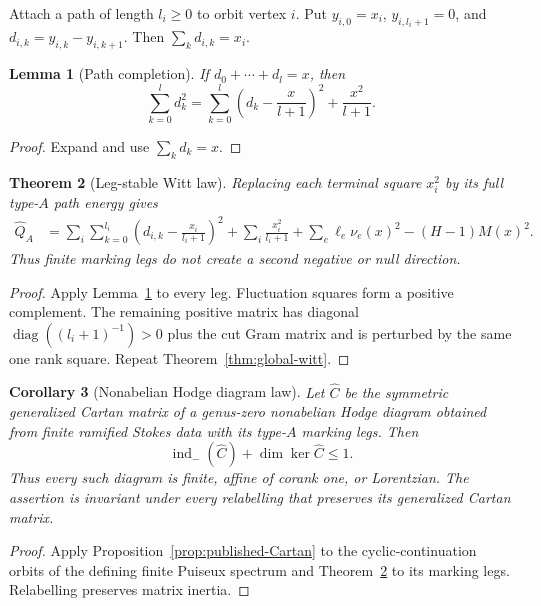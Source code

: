 \documentclass[11pt,a4paper]{amsart}
\theoremstyle{plain}
\newtheorem{theorem}{Theorem}[section]
\newtheorem{lemma}[theorem]{Lemma}
\newtheorem{corollary}[theorem]{Corollary}
\theoremstyle{definition}
\newcommand{\indm}{\operatorname{ind}_{-}}
\begin{document}
Attach a path of length $l_i\geq0$ to orbit vertex $i$.  Put $y_{i,0}=x_i$,
$y_{i,l_i+1}=0$, and $d_{i,k}=y_{i,k}-y_{i,k+1}$.  Then $\sum_kd_{i,k}=x_i$.

\begin{lemma}[Path completion]\label{lem:path}
If $d_0+\cdots+d_l=x$, then
\begin{equation}\label{eq:path}
 \sum_{k=0}^{l}d_k^2=
 \sum_{k=0}^{l}\left(d_k-\frac{x}{l+1}\right)^2+\frac{x^2}{l+1}.
\end{equation}
\end{lemma}

\begin{proof}
Expand and use $\sum_kd_k=x$.
\end{proof}

\begin{theorem}[Leg-stable Witt law]\label{thm:legs}
Replacing each terminal square $x_i^2$ by its full type-$A$ path energy gives
\begin{align}\label{eq:leg-law}
 \widehat Q_A
 &=\sum_i\sum_{k=0}^{l_i}\left(d_{i,k}-\frac{x_i}{l_i+1}\right)^2
   +\sum_i\frac{x_i^2}{l_i+1}
   +\sum_e\ell_e\nu_e(x)^2-(H-1)M(x)^2.
\end{align}
Thus finite marking legs do not create a second negative or null direction.
\end{theorem}

\begin{proof}
Apply Lemma~\ref{lem:path} to every leg.  Fluctuation squares form a positive complement.  The
remaining positive matrix has diagonal $\operatorname{diag}((l_i+1)^{-1})>0$ plus the cut Gram
matrix and is perturbed by the same one rank square.  Repeat Theorem~\ref{thm:global-witt}.
\end{proof}

\begin{corollary}[Nonabelian Hodge diagram law]\label{cor:nah-diagram}
Let $\widehat C$ be the symmetric generalized Cartan matrix of a genus-zero nonabelian Hodge
diagram obtained from finite ramified Stokes data with its type-$A$ marking legs.  Then
\begin{equation}\label{eq:nah-diagram-law}
                  \indm(\widehat C)+\dim\ker\widehat C\leq1.
\end{equation}
Thus every such diagram is finite, affine of corank one, or Lorentzian.  The assertion is invariant
under every relabelling that preserves its generalized Cartan matrix.
\end{corollary}

\begin{proof}
Apply Proposition~\ref{prop:published-Cartan} to the cyclic-continuation orbits of the defining
finite Puiseux spectrum and Theorem~\ref{thm:legs} to its marking legs.  Relabelling preserves
matrix inertia.
\end{proof}
\end{document}
